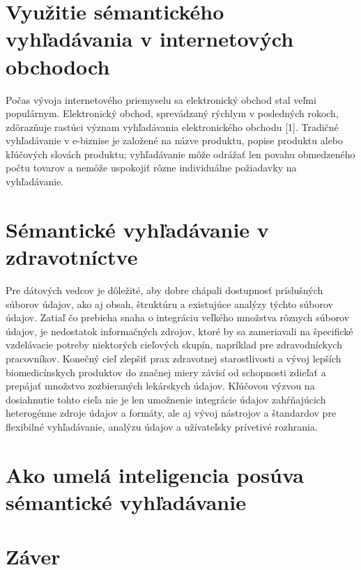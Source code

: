 \documentclass[10pt,twoside,slovak,a4paper]{article}
\begin{document}
\section{Využitie sémantického vyhľadávania v internetových obchodoch} \label{eshops}
\cite{5694914} Počas vývoja internetového priemyselu sa elektronický obchod stal veľmi populárnym. Elektronický obchod, sprevádzaný rýchlym v posledných rokoch, zdôrazňuje rastúci význam vyhľadávania elektronického obchodu [1]. Tradičné vyhľadávanie v e-biznise je založené na názve produktu, popise produktu alebo kľúčových slovách produktu; vyhľadávanie môže odrážať len povahu obmedzeného počtu tovarov a nemôže uspokojiť rôzne individuálne požiadavky na vyhľadávanie.





\section{Sémantické vyhľadávanie v zdravotníctve} \label{healthcare}
\cite{8217758} Pre dátových vedcov je dôležité, aby dobre chápali dostupnosť príslušných súborov údajov, ako aj obsah, štruktúru a existujúce analýzy týchto súborov údajov. Zatiaľ čo prebieha snaha o integráciu veľkého množstva rôznych súborov údajov, je nedostatok informačných zdrojov, ktoré by sa zameriavali na špecifické vzdelávacie potreby niektorých cieľových skupín, napríklad pre zdravodníckych pracovníkov.
\cite{zenuni2015state}Konečný cieľ zlepšiť prax zdravotnej starostlivosti a vývoj lepších biomedicínskych produktov do značnej miery závisí od schopnosti zdieľať a prepájať množstvo zozbieraných lekárskych údajov. Kľúčovou výzvou na dosiahnutie tohto cieľa nie je len umožnenie integrácie údajov zahŕňajúcich heterogénne zdroje údajov a formáty, ale aj vývoj nástrojov a štandardov pre flexibilné vyhľadávanie, analýzu údajov a užívateľsky prívetivé rozhrania.


\section{Ako umelá inteligencia posúva sémantické vyhľadávanie} \label{ai}




\section{Záver} \label{zaver} %






\end{document}
